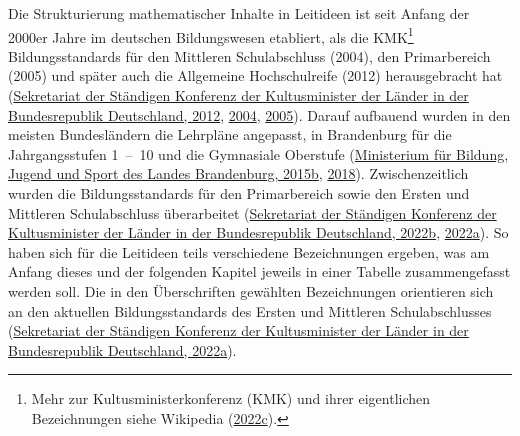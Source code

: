 \documentclass[
]{scrbook}
\theoremstyle{definition}
\theoremstyle{definition}
\theoremstyle{definition}
\theoremstyle{definition}
\theoremstyle{remark}
\begin{document}
Die Strukturierung mathematischer Inhalte in Leitideen ist seit Anfang der 2000er Jahre im deutschen Bildungswesen etabliert, als die KMK\footnote{Mehr zur Kultusministerkonferenz (KMK) und ihrer eigentlichen Bezeichnungen siehe Wikipedia (\protect\hyperlink{ref-dewiki:228417777}{2022c}).} Bildungsstandards für den Mittleren Schulabschluss (2004), den Primarbereich (2005) und später auch die Allgemeine Hochschulreife (2012) herausgebracht hat (\protect\hyperlink{ref-KMK:2012}{Sekretariat der Ständigen Konferenz der Kultusminister der Länder in der Bundesrepublik Deutschland, 2012}, \protect\hyperlink{ref-KMK:2004a}{2004}, \protect\hyperlink{ref-KMK2005}{2005}). Darauf aufbauend wurden in den meisten Bundesländern die Lehrpläne angepasst, in Brandenburg für die Jahrgangsstufen 1~--~10 und die Gymnasiale Oberstufe (\protect\hyperlink{ref-MinisteriumfurBildungJugendundSportdesLandesBrandenburg2015a}{Ministerium für Bildung, Jugend und Sport des Landes Brandenburg, 2015b}, \protect\hyperlink{ref-MinisteriumfurBildungJugendundSportdesLandesBrandenburg2018}{2018}). Zwischenzeitlich wurden die Bildungsstandards für den Primarbereich sowie den Ersten und Mittleren Schulabschluss überarbeitet (\protect\hyperlink{ref-SekretariatderStandigenKonferenzderKultusministerderLanderinderBundesrepublikDeutschland2022a}{Sekretariat der Ständigen Konferenz der Kultusminister der Länder in der Bundesrepublik Deutschland, 2022b}, \protect\hyperlink{ref-SekretariatderStandigenKonferenzderKultusministerderLanderinderBundesrepublikDeutschland2022}{2022a}). So haben sich für die Leitideen teils verschiedene Bezeichnungen ergeben, was am Anfang dieses und der folgenden Kapitel jeweils in einer Tabelle zusammengefasst werden soll. Die in den Überschriften gewählten Bezeichnungen orientieren sich an den aktuellen Bildungsstandards des Ersten und Mittleren Schulabschlusses (\protect\hyperlink{ref-SekretariatderStandigenKonferenzderKultusministerderLanderinderBundesrepublikDeutschland2022}{Sekretariat der Ständigen Konferenz der Kultusminister der Länder in der Bundesrepublik Deutschland, 2022a}).
\end{document}
